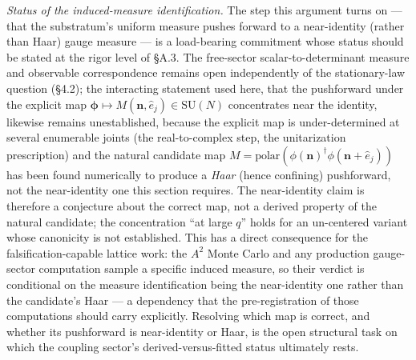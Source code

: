 \documentclass[
]{article}
\begin{document}
\emph{Status of the induced-measure identification.} The step this
argument turns on --- that the substratum's uniform measure pushes
forward to a near-identity (rather than Haar) gauge measure --- is a
load-bearing commitment whose status should be stated at the rigor level
of §A.3. The free-sector scalar-to-determinant measure and observable
correspondence remains open independently of the stationary-law question
(§4.2); the interacting statement used here, that the pushforward under
the explicit map
\(\boldsymbol{\phi} \mapsto M(\mathbf{n}, \hat e_j) \in \mathrm{SU}(N)\)
concentrates near the identity, likewise remains unestablished, because
the explicit map is under-determined at several enumerable joints (the
real-to-complex step, the unitarization prescription) and the natural
candidate map
\(M = \mathrm{polar}(\phi(\mathbf{n})^\dagger \phi(\mathbf{n}+\hat e_j))\)
has been found numerically to produce a \emph{Haar} (hence confining)
pushforward, not the near-identity one this section requires. The
near-identity claim is therefore a conjecture about the correct map, not
a derived property of the natural candidate; the concentration ``at
large \(q\)'' holds for an un-centered variant whose canonicity is not
established. This has a direct consequence for the falsification-capable
lattice work: the \(A^2\) Monte Carlo and any production gauge-sector
computation sample a specific induced measure, so their verdict is
conditional on the measure identification being the near-identity one
rather than the candidate's Haar --- a dependency that the
pre-registration of those computations should carry explicitly.
Resolving which map is correct, and whether its pushforward is
near-identity or Haar, is the open structural task on which the coupling
sector's derived-versus-fitted status ultimately rests.
\end{document}
